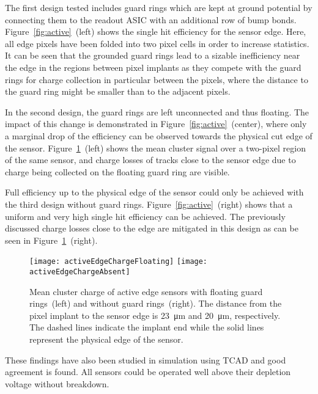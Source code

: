 \documentclass[a4paper,11pt]{article}
\begin{document}
The first design tested includes guard rings which are kept at ground potential by connecting them to the readout ASIC with an additional row of bump bonds.
Figure~\ref{fig:active}~(left) shows the single hit efficiency for the sensor edge.
Here, all edge pixels have been folded into two pixel cells in order to increase statistics.
It can be seen that the grounded guard rings lead to a sizable inefficiency near the edge in the regions between pixel implants as they compete with the guard rings for charge collection in particular between the pixels, where the distance to the guard ring might be smaller than to the adjacent pixels.

In the second design, the guard rings are left unconnected and thus floating.
The impact of this change is demonstrated in Figure~\ref{fig:active}~(center), where only a marginal drop of the efficiency can be observed towards the physical cut edge of the sensor.
Figure~\ref{fig:activeq}~(left) shows the mean cluster signal over a two-pixel region of the same sensor, and charge losses of tracks close to the sensor edge due to charge being collected on the floating guard ring are visible.

Full efficiency up to the physical edge of the sensor could only be achieved with the third design without guard rings.
Figure~\ref{fig:active}~(right) shows that a uniform and very high single hit efficiency can be achieved.
The previously discussed charge losses close to the edge are mitigated in this design as can be seen in Figure~\ref{fig:activeq}~(right).

\begin{figure}[tbp]
  \center
  \texttt{[image: activeEdgeChargeFloating]}%
  \texttt{[image: activeEdgeChargeAbsent]}
  \caption[Mean cluster charge of active edge sensors]{Mean cluster charge of active edge sensors with floating guard rings~(left) and without guard rings~(right). The distance from the pixel implant to the sensor edge is \SI{23}{\um} and \SI{20}{\um}, respectively. The dashed lines indicate the implant end while the solid lines represent the physical edge of the sensor.}
  \label{fig:activeq}
\end{figure}

These findings have also been studied in simulation using TCAD and good agreement is found.
All sensors could be operated well above their depletion voltage without breakdown.
\end{document}
